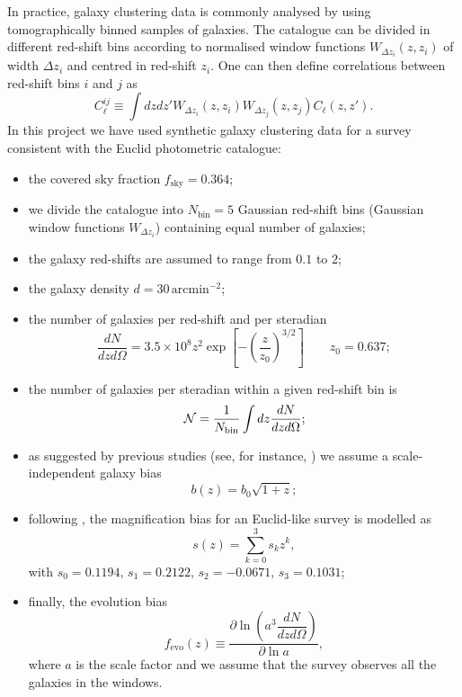 In practice, galaxy clustering data is commonly analysed by using tomographically binned samples of galaxies. The catalogue can be divided in different red-shift bins according to normalised window functions $W_{\Delta z_i}(z,z_i)$ of width $\Delta z_i$ and centred in red-shift $z_i$. One can then define correlations between red-shift bins $i$ and $j$ as
\begin{equation}
\label{Eq:binned-angular-matter-power-spectrum}
C_\ell^{ij} \equiv \int dz dz' W_{\Delta z_i}(z,z_i) W_{\Delta z_j}(z,z_j) C_\ell (z,z').
\end{equation} 
In this project we have used synthetic galaxy clustering data for a survey consistent with the Euclid photometric catalogue:
\begin{itemize}
\item the covered sky fraction $f_{\mathrm{sky}}=0.364$; 
\item we divide the catalogue into $N_{\mathrm{bin}}=5$ Gaussian red-shift bins (Gaussian window functions $W_{\Delta z_i}$) containing equal number of galaxies;
\item the galaxy red-shifts are assumed to range from $0.1$ to $2$;
\item the galaxy density $d=30\,\mathrm{arcmin^{-2}}$;
\item the number of galaxies per red-shift and per steradian 
\begin{equation}
\label{Eq:dNdzdOmega}
\dfrac{dN}{dzd\Omega} = 3.5\times 10^8 z^2 \exp \left[-\left( \frac{z}{z_0} \right)^{3/2} \right] \qquad z_0=0.637; 
\end{equation}
\item the number of galaxies per steradian within a given red-shift bin is 
\begin{equation}
\label{Eq:number-galaxies-per-bin}
\,{\mathcal N} = \frac{1}{N_{\mathrm{bin}}}\int dz \dfrac{dN}{dzd\Omega};
\end{equation}
\item as suggested by previous studies (see, for instance, \cite{Tegmark:2003uf}) we assume a scale-independent galaxy bias 
\begin{equation}
b(z) = b_0\sqrt{1+z};
\label{Eq:galaxy-bias}
\end{equation}
\item following \cite{Montanari:2015rga}, the magnification bias for an Euclid-like survey is modelled as 
\begin{equation}
s(z) = \sum_{k=0}^3 s_k z^k,
\label{Eq:magnification-bias}
\end{equation}
with $s_0 = 0.1194,\, s_1 = 0.2122,\, s_2 = -0.0671,\, s_3 = 0.1031$;
\item finally, the evolution bias 
\begin{equation}
f_{\mathrm{evo}}(z) \equiv \dfrac{\partial \ln \left( a^3 \dfrac{dN}{dzd\Omega}  \right)}{\partial \ln a},
\label{Eq:evolution-bias}
\end{equation}    
where $a$ is the scale factor and we assume that the survey observes all the galaxies in the windows.
\end{itemize}   

